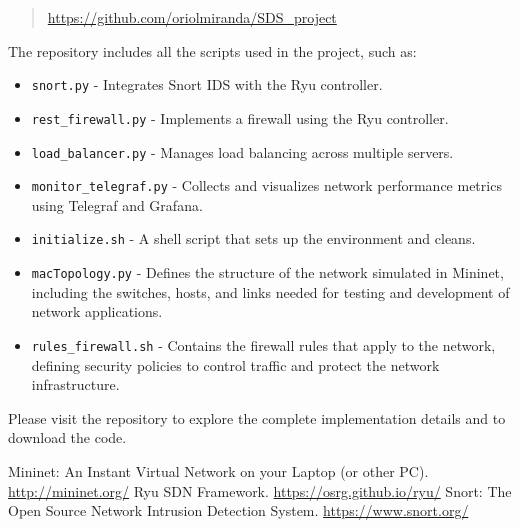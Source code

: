 \documentclass[a4paper,12pt]{article}
\begin{document}
\begin{quote}
\url{https://github.com/oriolmiranda/SDS_project}
\end{quote}

The repository includes all the scripts used in the project, such as:

\begin{itemize}
    \item \texttt{snort.py} - Integrates Snort IDS with the Ryu controller.
    \item \texttt{rest\_firewall.py} - Implements a firewall using the Ryu controller.
    \item \texttt{load\_balancer.py} - Manages load balancing across multiple servers.
    \item \texttt{monitor\_telegraf.py} - Collects and visualizes network performance metrics using Telegraf and Grafana.
    \item \texttt{initialize.sh} - A shell script that sets up the environment and cleans.
    \item \texttt{macTopology.py} - Defines the structure of the network simulated in Mininet, including the switches, hosts, and links needed for testing and development of network applications.
    \item \texttt{rules\_firewall.sh} - Contains the firewall rules that apply to the network, defining security policies to control traffic and protect the network infrastructure.
\end{itemize}

Please visit the repository to explore the complete implementation details and to download the code.

\begin{thebibliography}{9}
 Mininet: An Instant Virtual Network on your Laptop (or other PC). \url{http://mininet.org/}
 Ryu SDN Framework. \url{https://osrg.github.io/ryu/}
 Snort: The Open Source Network Intrusion Detection System. \url{https://www.snort.org/}
\end{thebibliography}
\end{document}
